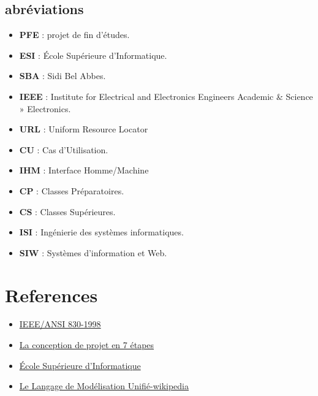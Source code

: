 \documentclass[11pt,fleqn]{book} %
\begin{document}
\subsection{abréviations}
\begin{itemize}
    \item \textbf{PFE} : projet de fin d'études.
    \item \textbf{ESI} : École Supérieure d'Informatique.
    \item \textbf{SBA} : Sidi Bel Abbes.
    \item \textbf{IEEE} : Institute for Electrical and Electronics Engineers Academic & Science » Electronics. 
    \item \textbf{URL} : Uniform Resource Locator
    \item \textbf{CU} : Cas d’Utilisation.
    \item \textbf{IHM} : Interface Homme/Machine
    \item \textbf{CP} : Classes Préparatoires.
    \item \textbf{CS} : Classes Supérieures.
    \item \textbf{ISI} : Ingénierie des systèmes informatiques.
    \item \textbf{SIW} : Systèmes d'information et Web.

\end{itemize}
\section{References}
\begin{itemize}
    \item  \href{https://ieeexplore.ieee.org/document/720574}{IEEE/ANSI 830-1998}
    \item \href{https://asana.com/fr/resources/project-design}{La conception de projet en 7 étapes}
    \item \href{https://www.esi-sba.dz/fr/}{École Supérieure d'Informatique}
    \item \href{https://fr.wikipedia.org/wiki/UML_(informatique)}{Le Langage de Modélisation Unifié-wikipedia}
\end{itemize}
\end{document}
